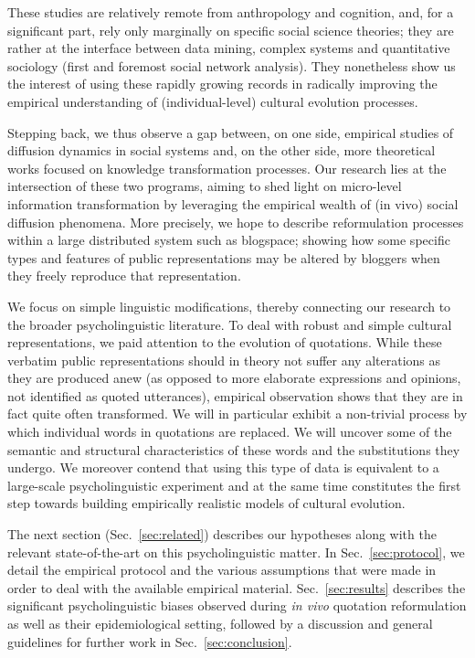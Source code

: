 These studies are relatively remote from anthropology and cognition, and, for a significant part, rely only marginally on specific social science theories; they are rather at the interface between data mining, complex systems and quantitative sociology (first and foremost social network analysis). They nonetheless show us the interest of using these rapidly growing records %
in radically improving the empirical understanding of (individual-level) cultural evolution processes.


\bigskip
Stepping back, we thus observe a gap between, on one side, empirical studies of diffusion dynamics in social systems and, on the other side, more theoretical works  focused on knowledge transformation processes. %
Our research lies at the intersection of these two programs, aiming to shed light on micro-level information transformation by leveraging the empirical wealth of (in vivo) social diffusion phenomena. More precisely, we hope to describe reformulation processes within a large distributed system such as blogspace; showing how some specific types and features of public representations may be altered by bloggers when they freely reproduce that representation.

We focus on simple linguistic modifications, thereby connecting our research to the broader psycholinguistic literature.
To deal with robust and simple cultural representations, we paid attention to the evolution of quotations.
While these verbatim public representations should in theory not suffer any alterations as they are produced anew (as opposed to more elaborate expressions and opinions, not identified as quoted utterances), empirical observation shows that they are in fact quite often transformed.
We will in particular exhibit a non-trivial process by which individual words in quotations are replaced.
We will uncover some of the semantic and structural characteristics of these words and the substitutions they undergo.
We moreover contend that using this type of data is equivalent to a large-scale psycholinguistic experiment and at the same time constitutes the first step towards building empirically realistic models of cultural evolution.

The next section (Sec.~\ref{sec:related}) describes our hypotheses along with the relevant state-of-the-art on this psycholinguistic matter.
In Sec.~\ref{sec:protocol}, we detail the empirical protocol and the various assumptions that were made in order to deal with the available empirical material.
Sec.~\ref{sec:results} describes the significant psycholinguistic biases observed during \emph{in vivo} quotation reformulation as well as their epidemiological setting, followed by a discussion and general guidelines for further work in Sec.~\ref{sec:conclusion}.

